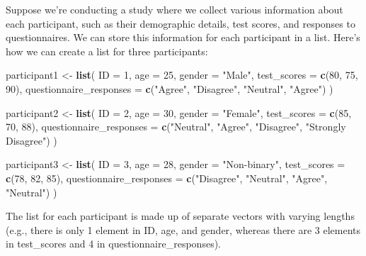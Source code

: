 \documentclass[
]{book}
\newenvironment{Shaded}{\begin{snugshade}}{\end{snugshade}}
\newcommand{\AttributeTok}[1]{\textcolor[rgb]{0.13,0.29,0.53}{#1}}
\newcommand{\DecValTok}[1]{\textcolor[rgb]{0.00,0.00,0.81}{#1}}
\newcommand{\FunctionTok}[1]{\textcolor[rgb]{0.13,0.29,0.53}{\textbf{#1}}}
\newcommand{\NormalTok}[1]{#1}
\newcommand{\OtherTok}[1]{\textcolor[rgb]{0.56,0.35,0.01}{#1}}
\newcommand{\StringTok}[1]{\textcolor[rgb]{0.31,0.60,0.02}{#1}}
\begin{document}
Suppose we're conducting a study where we collect various information about each participant, such as their demographic details, test scores, and responses to questionnaires. We can store this information for each participant in a list. Here's how we can create a list for three participants:

\begin{Shaded}
\begin{Highlighting}[]
\NormalTok{participant1 }\OtherTok{\textless{}{-}} \FunctionTok{list}\NormalTok{(}
  \AttributeTok{ID =} \DecValTok{1}\NormalTok{,}
  \AttributeTok{age =} \DecValTok{25}\NormalTok{,}
  \AttributeTok{gender =} \StringTok{"Male"}\NormalTok{,}
  \AttributeTok{test\_scores =} \FunctionTok{c}\NormalTok{(}\DecValTok{80}\NormalTok{, }\DecValTok{75}\NormalTok{, }\DecValTok{90}\NormalTok{),}
  \AttributeTok{questionnaire\_responses =} \FunctionTok{c}\NormalTok{(}\StringTok{"Agree"}\NormalTok{, }\StringTok{"Disagree"}\NormalTok{, }\StringTok{"Neutral"}\NormalTok{, }\StringTok{"Agree"}\NormalTok{)}
\NormalTok{)}

\NormalTok{participant2 }\OtherTok{\textless{}{-}} \FunctionTok{list}\NormalTok{(}
  \AttributeTok{ID =} \DecValTok{2}\NormalTok{,}
  \AttributeTok{age =} \DecValTok{30}\NormalTok{,}
  \AttributeTok{gender =} \StringTok{"Female"}\NormalTok{,}
  \AttributeTok{test\_scores =} \FunctionTok{c}\NormalTok{(}\DecValTok{85}\NormalTok{, }\DecValTok{70}\NormalTok{, }\DecValTok{88}\NormalTok{),}
  \AttributeTok{questionnaire\_responses =} \FunctionTok{c}\NormalTok{(}\StringTok{"Neutral"}\NormalTok{, }\StringTok{"Agree"}\NormalTok{, }\StringTok{"Disagree"}\NormalTok{, }\StringTok{"Strongly Disagree"}\NormalTok{)}
\NormalTok{)}

\NormalTok{participant3 }\OtherTok{\textless{}{-}} \FunctionTok{list}\NormalTok{(}
  \AttributeTok{ID =} \DecValTok{3}\NormalTok{,}
  \AttributeTok{age =} \DecValTok{28}\NormalTok{,}
  \AttributeTok{gender =} \StringTok{"Non{-}binary"}\NormalTok{,}
  \AttributeTok{test\_scores =} \FunctionTok{c}\NormalTok{(}\DecValTok{78}\NormalTok{, }\DecValTok{82}\NormalTok{, }\DecValTok{85}\NormalTok{),}
  \AttributeTok{questionnaire\_responses =} \FunctionTok{c}\NormalTok{(}\StringTok{"Disagree"}\NormalTok{, }\StringTok{"Neutral"}\NormalTok{, }\StringTok{"Agree"}\NormalTok{, }\StringTok{"Neutral"}\NormalTok{)}
\NormalTok{)}
\end{Highlighting}
\end{Shaded}

The list for each participant is made up of separate vectors with varying lengths (e.g., there is only 1 element in ID, age, and gender, whereas there are 3 elements in test\_scores and 4 in questionnaire\_responses).
\end{document}

